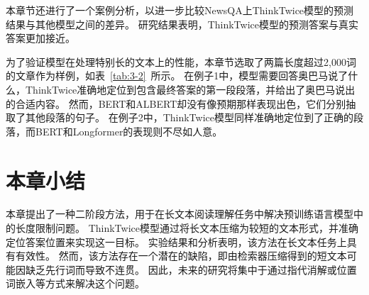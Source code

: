 

本章节还进行了一个案例分析，以进一步比较NewsQA上ThinkTwice模型的预测结果与其他模型之间的差异。
研究结果表明，ThinkTwice模型的预测答案与真实答案更加接近。

为了验证模型在处理特别长的文本上的性能，本章节选取了两篇长度超过2,000词的文章作为样例，如表~\ref{tab:3-2}~所示。
在例子1中，模型需要回答奥巴马说了什么，ThinkTwice准确地定位到包含最终答案的第一段段落，并给出了奥巴马说出的合适内容。
然而，BERT和ALBERT却没有像预期那样表现出色，它们分别抽取了其他段落的句子。
在例子2中，ThinkTwice模型同样准确地定位到了正确的段落，而BERT和Longformer的表现则不尽如人意。



\section{本章小结}
本章提出了一种二阶段方法，用于在长文本阅读理解任务中解决预训练语言模型中的长度限制问题。
ThinkTwice模型通过将长文本压缩为较短的文本形式，并准确定位答案位置来实现这一目标。
实验结果和分析表明，该方法在长文本任务上具有有效性。
然而，该方法存在一个潜在的缺陷，即由检索器压缩得到的短文本可能因缺乏先行词而导致不连贯。
因此，未来的研究将集中于通过指代消解或位置词嵌入等方式来解决这个问题。


